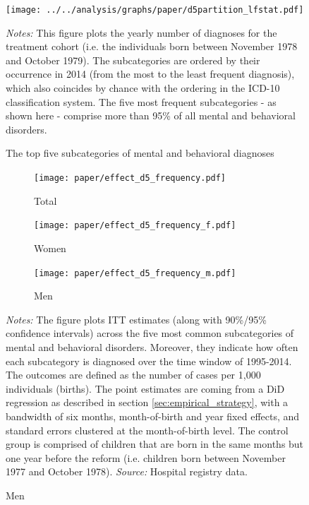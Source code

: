 \documentclass[11pt, a4paper]{article} %
\begin{document}
 
\vspace*{\fill}
\begin{figure}[H]\centering
	\caption{The top five subcategories of mental and behavioral diagnoses}\label{fig: d5partition}
	\texttt{[image: ../../analysis/graphs/paper/d5partition\_lfstat.pdf]}
	\scriptsize
	\begin{minipage}{0.9\linewidth}
	\emph{Notes:} This figure plots the yearly number of diagnoses for the treatment cohort (i.e. the individuals born between November 1978 and October 1979). The subcategories are ordered by their occurrence in 2014 (from the most to the least frequent diagnosis), which also coincides by chance with the ordering in the ICD-10 classification system. The five most frequent subcategories - as shown here - comprise more than 95\% of all mental and behavioral disorders. 
	\end{minipage}
\end{figure}
\vspace*{\fill}\clearpage%
\begin{landscape}
	\vspace*{\fill}
	\begin{figure}
		[H]\centering
		\caption{ITT effect for \textbf{subcategories of mental and behavioral disorders (pooled)}}\label{fig: ITT_d5_subcategories}
		\begin{subfigure}[h]{0.31\linewidth}\centering\caption{Total}
			\texttt{[image: paper/effect\_d5\_frequency.pdf]}
		\end{subfigure}
		\begin{subfigure}[h]{0.31\linewidth}\centering\caption{Women}
			\texttt{[image: paper/effect\_d5\_frequency\_f.pdf]}
		\end{subfigure}
		\begin{subfigure}[h]{0.31\linewidth}\centering\caption{Men}
			\texttt{[image: paper/effect\_d5\_frequency\_m.pdf]}
		\end{subfigure}
		\scriptsize
		\begin{minipage}{0.95\linewidth}
			\emph{Notes:} The figure plots ITT estimates (along with 90\%/95\% confidence intervals) across the five most common subcategories of mental and behavioral disorders. Moreover, they indicate how often each subcategory is diagnosed over the time window of 1995-2014. The outcomes are defined as the number of cases per 1,000 individuals (births). The point estimates are coming from a DiD regression as described in section \ref{sec:empirical_strategy}, with a bandwidth of six months, month-of-birth and year fixed effects, and standard errors clustered at the month-of-birth level. The control group is comprised of children that are born in the same months but one year before the reform (i.e. children born between November 1977 and October 1978).\newline
			\emph{Source:} Hospital registry data.
		\end{minipage}
	\end{figure}
	\vspace*{\fill}\clearpage
\end{landscape}
\end{document}
